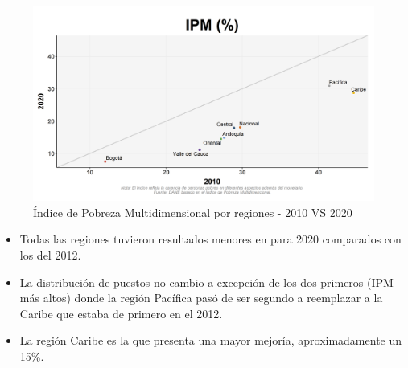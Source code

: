     \begin{figure}[H]
        \caption{Índice de Pobreza Multidimensional por regiones - 2010 VS 2020 \label{map_result_2} }
        \begin{center}
        \includegraphics[width=\textwidth,keepaspectratio]{img/var_270_scatter_time.png}
        \end{center}
    \end{figure}
            \begin{itemize}
                    \item Todas las regiones tuvieron resultados menores en para 2020 comparados con los del 2012.
                    \item La distribución de puestos no cambio a excepción de los dos primeros (IPM más altos) donde la región Pacífica pasó de ser segundo a reemplazar a la Caribe que estaba de primero en el 2012.
                    \item La región Caribe es la que presenta una mayor mejoría, aproximadamente un 15\%.
                    \end{itemize}

